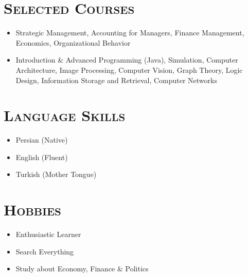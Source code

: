 \documentclass[line,margin]{res}
\begin{document}
\begin{resume}
\begin{spacing}{1.1}
\section{\textsc{Selected Courses}}
\begin{itemize}
\item Strategic Management, Accounting for Managers, Finance Management, Economics, Organizational Behavior 
\item Introduction \& Advanced Programming (Java), Simulation, Computer Architecture, Image Processing, Computer Vision, 	Graph Theory, Logic Design, Information Storage and Retrieval, Computer Networks
\end{itemize}

\section{\textsc{Language Skills}}
\begin{itemize}
 \item Persian (Native)
\item English (Fluent)
\item Turkish (Mother Tongue)

\end{itemize}

\section{\textsc{Hobbies}}
\begin{itemize}
\item Enthusiastic Learner
\item Search Everything %
\item Study about Economy, Finance \& Politics
\end{itemize}

\end{spacing}
\end{resume}
\end{document}
